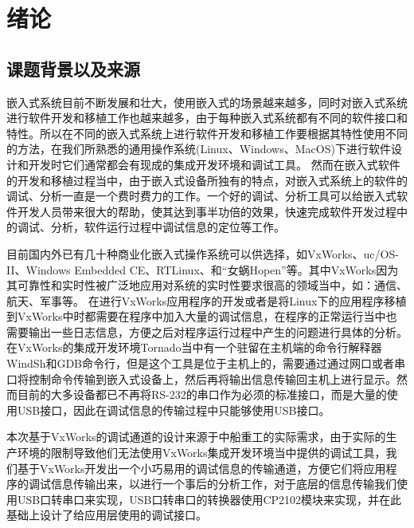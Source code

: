 \chapter{绪论}
\section{课题背景以及来源}
	嵌入式系统目前不断发展和壮大，使用嵌入式的场景越来越多，同时对嵌入式系统进行软件开发和移植工作也越来越多，由于每种嵌入式系统都有不同的软件接口和特性。所以在不同的嵌入式系统上进行软件开发和移植工作要根据其特性使用不同的方法，在我们所熟悉的通用操作系统(Linux、Windows、MacOS)下进行软件设计和开发时它们通常都会有现成的集成开发环境和调试工具。
	然而在嵌入式软件的开发和移植过程当中，由于嵌入式设备所独有的特点，对嵌入式系统上的软件的调试、分析一直是一个费时费力的工作。一个好的调试、分析工具可以给嵌入式软件开发人员带来很大的帮助，使其达到事半功倍的效果，快速完成软件开发过程中的调试、分析，软件运行过程中调试信息的定位等工作。
		
	目前国内外已有几十种商业化嵌入式操作系统可以供选择，如VxWorks、uc/OS-II、Windows Embedded CE、RTLinux、和“女蜗Hopen”等。其中VxWorks因为其可靠性和实时性被广泛地应用对系统的实时性要求很高的领域当中，如：通信、航天、军事等\cite{刘小军2008基于}。
	在进行VxWorks应用程序的开发或者是将Linux下的应用程序移植到VxWorks中时都需要在程序中加入大量的调试信息，在程序的正常运行当中也需要输出一些日志信息，方便之后对程序运行过程中产生的问题进行具体的分析。在VxWorks的集成开发环境Tornado当中有一个驻留在主机端的命令行解释器WindSh和GDB命令行，但是这个工具是位于主机上的，需要通过通过网口或者串口将控制命令传输到嵌入式设备上，然后再将输出信息传输回主机上进行显示。然而目前的大多设备都已不再将RS-232的串口作为必须的标准接口，而是大量的使用USB接口，因此在调试信息的传输过程中只能够使用USB接口。
	
	
	本次基于VxWorks的调试通道的设计来源于中船重工的实际需求，由于实际的生产环境的限制导致他们无法使用VxWorks集成开发环境当中提供的调试工具，我们基于VxWorks开发出一个小巧易用的调试信息的传输通道，方便它们将应用程序的调试信息传输出来，以进行一个事后的分析工作，对于底层的信息传输我们使用USB口转串口来实现，USB口转串口的转换器使用CP2102模块来实现，并在此基础上设计了给应用层使用的调试接口。
	
		
			
